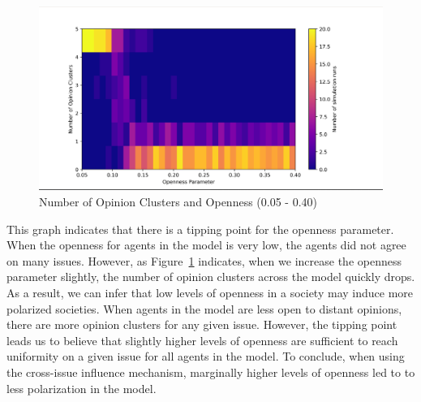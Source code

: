 \begin{figure}
\centering
\includegraphics[width=1.0\columnwidth]{./Graphs/Cluster_opensmall.png}
\caption{Number of Opinion Clusters and Openness (0.05 - 0.40)}
\label{H2b_plot_small}
\end{figure}

This graph indicates that there is a tipping point for the openness parameter.
When the openness for agents in the model is very low, the agents did not agree
on many issues. However, as Figure~\ref{H2b_plot_small} indicates, when we
increase the openness parameter slightly, the number of opinion clusters across
the model quickly drops. As a result, we can infer that low levels of openness
in a society may induce more polarized societies. When agents in the model are
less open to distant opinions, there are more opinion clusters for any given
issue. However, the tipping point leads us to believe that slightly higher
levels of openness are sufficient to reach uniformity on a given issue for all
agents in the model. To conclude, when using the cross-issue influence
mechanism, marginally higher levels of openness led to to less polarization in
the model.


